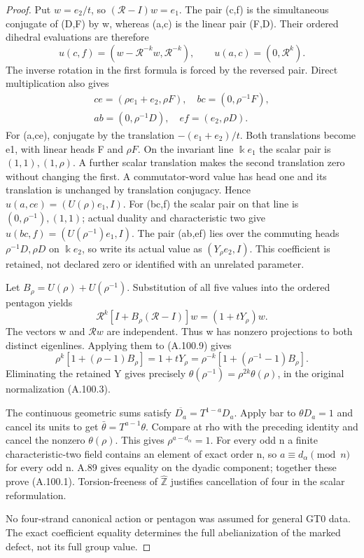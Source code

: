 \begin{proof}
Put \(w=e_2/t\), so \((\mathcal R-I)w=e_1\).
The pair (c,f) is the simultaneous conjugate of (D,F) by w,
whereas (a,c) is the linear pair (F,D). Their ordered dihedral
evaluations are therefore
\[
 u(c,f)=(w-\mathcal R^{-k}w,\mathcal R^{-k}),
 \qquad u(a,c)=(0,\mathcal R^k).
 \tag{A.100.7}
\]
The inverse rotation in the first formula is forced by the reversed
pair. Direct multiplication also gives
\[
\begin{gathered}
 ce=(\rho e_1+e_2,\rho F),\quad bc=(0,\rho^{-1}F),\\
 ab=(0,\rho^{-1}D),\quad ef=(e_2,\rho D).
\end{gathered}
\tag{A.100.8}
\]
For (a,ce), conjugate by the translation
\(-(e_1+e_2)/t\). Both translations become e1, with linear
heads F and \(\rho F\). On the invariant line \(\Bbbk e_1\)
the scalar pair is \((1,1),(1,\rho)\). A further scalar
translation makes the second translation zero without changing
the first. A commutator-word value has head one and its translation
is unchanged by translation conjugacy. Hence
\(u(a,ce)=(U(\rho)e_1,I)\).
For (bc,f) the scalar pair on that line is
\((0,\rho^{-1}),(1,1)\); actual duality and characteristic two
give \(u(bc,f)=(U(\rho^{-1})e_1,I)\).
The pair (ab,ef) lies over the commuting heads
\(\rho^{-1}D,\rho D\) on \(\Bbbk e_2\), so write its actual
value as \((Y_\rho e_2,I)\). This coefficient is retained, not
declared zero or identified with an unrelated parameter.

Let \(B_\rho=U(\rho)+U(\rho^{-1})\). Substitution of all five
values into the ordered pentagon yields
\[
 \mathcal R^k[I+B_\rho(\mathcal R-I)]w
                       =(1+tY_\rho)w.
 \tag{A.100.9}
\]
The vectors w and \(\mathcal Rw\) are independent. Thus w has
nonzero projections to both distinct eigenlines. Applying them to
(A.100.9) gives
\[
 \rho^k[1+(\rho-1)B_\rho]
  =1+tY_\rho
  =\rho^{-k}[1+(\rho^{-1}-1)B_\rho].
 \tag{A.100.10}
\]
Eliminating the retained Y gives precisely
\(\theta(\rho^{-1})=\rho^{2k}\theta(\rho)\), in the original
normalization (A.100.3).

The continuous geometric sums satisfy
\(\overline{D_a}=T^{1-a}D_a\). Apply bar to
\(\theta D_a=1\) and cancel its units to get
\(\bar\theta=T^{a-1}\theta\). Compare at rho with the preceding
identity and cancel the nonzero \(\theta(\rho)\). This gives
\(\rho^{a-d_\alpha}=1\). For every odd n a finite characteristic-two
field contains an element of exact order n, so
\(a\equiv d_\alpha\pmod n\) for every odd n. A.89 gives equality
on the dyadic component; together these prove (A.100.1).
Torsion-freeness of \(\widehat{\mathbb Z}\) justifies cancellation
of four in the scalar reformulation.

No four-strand canonical action or pentagon was assumed for general
GT0 data. The exact coefficient equality determines the full
abelianization of the marked defect, not its full group value.
\end{proof}
